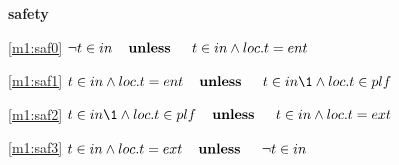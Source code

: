 \textbf{safety}
\begin{block}
\item[ \eqref{m1:saf0} ]$\neg t \in in  \textbf{\quad unless \quad} t \in in \land loc.t = ent $ %
\item[ \eqref{m1:saf1} ]$t \in in \land loc.t = ent  \textbf{\quad unless \quad} t \in in  %
		\1\land loc.t \in plf $ %
\item[ \eqref{m1:saf2} ]$t \in in  %
		\1\land loc.t \in plf  \textbf{\quad unless \quad} t \in in \land loc.t = ext $ %
\item[ \eqref{m1:saf3} ]$t \in in \land loc.t = ext  \textbf{\quad unless \quad} \neg t \in in $ %
\end{block}
